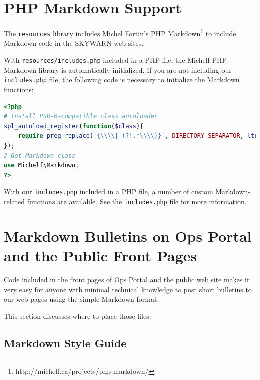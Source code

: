 \documentclass[pdflatex,letterpaper,twoside,12pt]{book}
\begin{document}

\section{PHP Markdown Support}

The \texttt{resources} library includes \href{http://michelf.ca/projects/php-markdown/}{Michel Fortin's PHP Markdown}\footnote{http://michelf.ca/projects/php-markdown/} to include Markdown code in the SKYWARN web sites.

With \texttt{resources/includes.php} included in a PHP file, the Michelf PHP Markdown library is automatically initialized.  If you are not including our \texttt{includes.php} file, the following code is necessary to initialize the Markdown functions:

\begin{lstlisting}[language=PHP]
<?php
# Install PSR-0-compatible class autoloader
spl_autoload_register(function($class){
	require preg_replace('{\\\\|_(?!.*\\\\)}', DIRECTORY_SEPARATOR, ltrim($class, '\\')).'.php';
});
# Get Markdown class
use Michelf\Markdown;
?>
\end{lstlisting}

With our \texttt{includes.php} included in a PHP file, a number of custom Markdown-related functions are available.  See the \texttt{includes.php} file for more information.


\section{Markdown Bulletins on Ops Portal and the Public Front Pages}\label{markdown-bulletins}

Code included in the front pages of Ops Portal and the public web site makes it very easy for anyone with minimal technical knowledge to post short bulletins to our web pages using the simple Markdown format.

This section discusses where to place those files.

\subsection{Markdown Style Guide}
\end{document}
